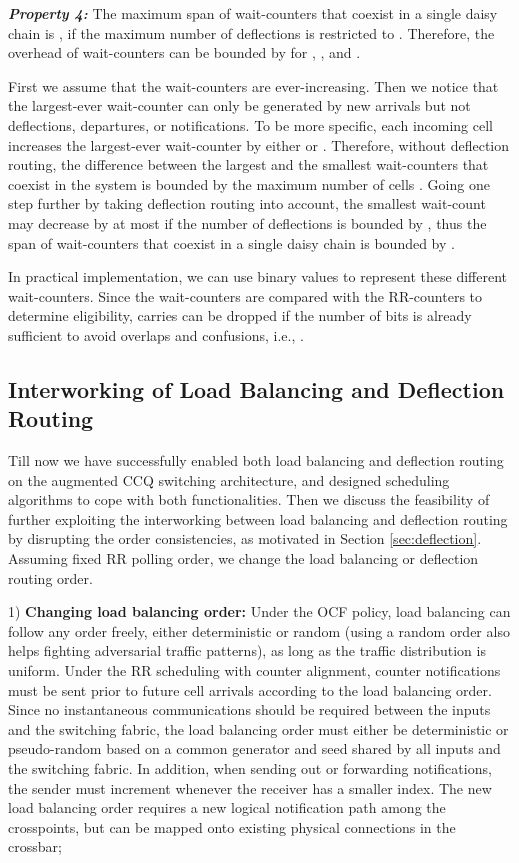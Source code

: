 \documentclass[journal,final,doublecolumn,10pt,twoside]{IEEEtranTCOM} \normalsize
\begin{document}
\textbf{\emph{Property 4:}} The maximum span of wait-counters that coexist in a single daisy chain is , if the maximum number of deflections is restricted to . Therefore, the overhead of wait-counters can be bounded by  for , , and .

First we assume that the wait-counters are ever-increasing. Then we notice that the largest-ever wait-counter can only be generated by new arrivals but not deflections, departures, or notifications. To be more specific, each incoming cell increases the largest-ever wait-counter by either  or . Therefore, without deflection routing, the difference between the largest and the smallest wait-counters that coexist in the system is bounded by the maximum number of cells . Going one step further by taking deflection routing into account, the smallest wait-count may decrease by at most  if the number of deflections is bounded by , thus the span of wait-counters that coexist in a single daisy chain is bounded by .

In practical implementation, we can use binary values to represent these different wait-counters. Since the wait-counters are compared with the RR-counters to determine eligibility, carries can be dropped if the number of bits is already sufficient to avoid overlaps and confusions, i.e., .



\subsection{Interworking of Load Balancing and Deflection Routing}

Till now we have successfully enabled both load balancing and deflection routing on the augmented CCQ switching architecture, and designed scheduling algorithms to cope with both functionalities. Then we discuss the feasibility of further exploiting the interworking between load balancing and deflection routing by disrupting the order consistencies, as motivated in Section \ref{sec:deflection}. Assuming fixed RR polling order, we change the load balancing or deflection routing order.

1) \textbf{Changing load balancing order:} Under the OCF policy, load balancing can follow any order freely, either deterministic or random (using a random order also helps fighting adversarial traffic patterns), as long as the traffic distribution is uniform. Under the RR scheduling with counter alignment, counter notifications must be sent prior to future cell arrivals according to the load balancing order. Since no instantaneous communications should be required between the inputs and the switching fabric, the load balancing order must either be deterministic or pseudo-random based on a common generator and seed shared by all inputs and the switching fabric. In addition, when sending out or forwarding notifications, the sender must increment  whenever the receiver has a smaller index. The new load balancing order requires a new logical notification path among the crosspoints, but can be mapped onto existing physical connections in the crossbar;
\end{document}
